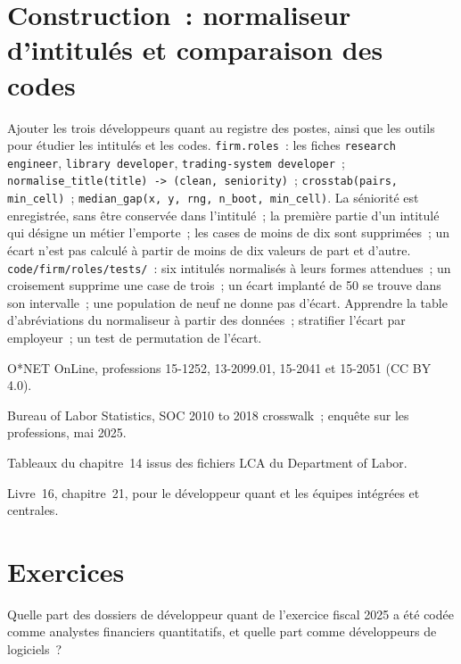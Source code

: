 \section{Construction~: normaliseur d'intitulés et comparaison des codes}\label{bld:in:quant-developer:roles}

\begin{build}
 Ajouter les trois développeurs quant au registre des postes, ainsi que les outils pour étudier les intitulés et les codes.
 \texttt{firm.roles}~: les fiches \texttt{research engineer}, \texttt{library developer},
\texttt{trading-system developer}~; \texttt{normalise\_title(title) -> (clean, seniority)}~;
\texttt{crosstab(pairs, min\_cell)}~; \texttt{median\_gap(x, y, rng, n\_boot, min\_cell)}.
 La séniorité est enregistrée, sans être conservée dans l'intitulé~; la première partie d'un intitulé qui désigne un métier l'emporte~;
les cases de moins de dix sont supprimées~; un écart n'est pas calculé à partir de moins de dix valeurs de part et d'autre.
 \texttt{code/firm/roles/tests/}~: six intitulés normalisés à leurs formes attendues~; un croisement supprime une case
de trois~; un écart implanté de 50 se trouve dans son intervalle~; une population de neuf ne donne pas d'écart.
 Apprendre la table d'abréviations du normaliseur à partir des données~; stratifier l'écart par employeur~; un test de
permutation de l'écart.
\end{build}

\begin{omsources}
\item O*NET OnLine, professions 15-1252, 13-2099.01, 15-2041 et 15-2051 (CC BY 4.0).
\item Bureau of Labor Statistics, SOC 2010 to 2018 crosswalk~; enquête sur les professions, mai 2025.
\item Tableaux du chapitre~14 issus des fichiers LCA du Department of Labor.
\item Livre~16, chapitre~21, pour le développeur quant et les équipes intégrées et centrales.
\end{omsources}

\section{Exercices}

\begin{exercise}[$\star$]\label{exo:in:quant-developer:1}
Quelle part des dossiers de développeur quant de l'exercice fiscal 2025 a été codée comme analystes financiers quantitatifs, et quelle part comme
développeurs de logiciels~?
\end{exercise}

